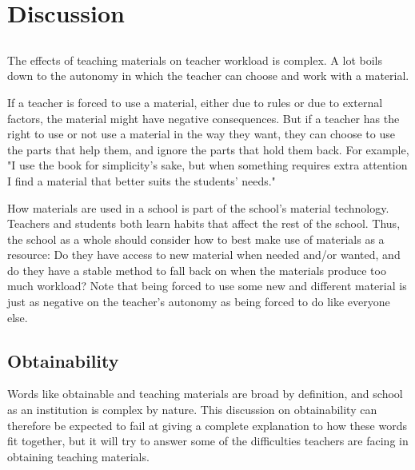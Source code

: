 \chapter{Discussion}
\section{}
The effects of teaching materials on teacher workload is complex. A lot boils down to the autonomy in which the teacher can choose and work with a material.

If a teacher is forced to use a material, either due to rules or due to external factors, the material might have negative consequences. But if a teacher has the right to use or not use a material in the way they want, they can choose to use the parts that help them, and ignore the parts that hold them back. For example, "I use the book for simplicity's sake, but when something requires extra attention I find a material that better suits the students' needs."

How materials are used in a school is part of the school's material technology. Teachers and students both learn habits that affect the rest of the school. Thus, the school as a whole should consider how to best make use of materials as a resource: Do they have access to new material when needed and/or wanted, and do they have a stable method to fall back on when the materials produce too much workload? Note that being forced to use some new and different material is just as negative on the teacher's autonomy as being forced to do like everyone else.

\section{Obtainability}
Words like obtainable and teaching materials are broad by definition, and school as an institution is complex by nature. This discussion on obtainability can therefore be expected to fail at giving a complete explanation to how these words fit together, but it will try to answer some of the difficulties teachers are facing in obtaining teaching materials.